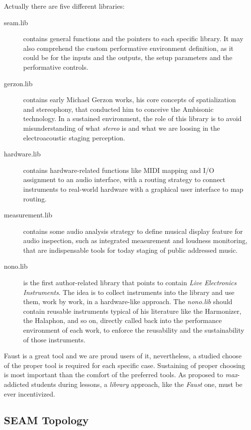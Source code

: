 \documentclass[twoside,a4paper]{article}
\begin{document}
Actually there are five different libraries:
\begin{description}
  \item[seam.lib] contains general functions and the pointers to each specific library. It may also comprehend the custom performative environment definition, as it could be for the inputs and the outputs, the setup parameters and the performative controls.
  \item[gerzon.lib] contains early Michael Gerzon works, his core concepts of spatialization and stereophony, that conducted him to conceive the Ambisonic technology. In a sustained environment, the role of this library is to avoid misunderstanding of what \emph{stereo} is \cite{ab58} and what we are loosing in the electroacoustic staging perception. 
  \item[hardware.lib] contains hardware-related functions like MIDI mapping and I/O assignment to an audio interface, with a routing strategy to connect instruments to real-world hardware with a graphical user interface to map routing.
  \item[measurement.lib] contains some audio analysis strategy to define musical display feature for audio inspection, such as integrated measurement and loudness monitoring, that are indispensable tools for today staging of public addressed music.
  \item[nono.lib] is the first author-related library that points to contain \emph{Live Electronics Instruments}. The idea is to collect instruments into the library and use them, work by work, in a hardware-like approach. The \emph{nono.lib} should contain reusable instruments typical of his literature like the Harmonizer, the Halaphon, and so on, directly called back into the performance environment of each work, to enforce the reusability and the sustainability of those instruments. 
\end{description}

Faust is a great tool and we are proud users of it, nevertheless, a studied choose of the proper tool is required for each specific case. Sustaining of proper choosing is most important than the comfort of the preferred tools. As proposed to \emph{max}-addicted students during lessons, a \emph{library} approach, like the \emph{Faust} one, must be ever incentivized.


\subsection{SEAM Topology}
\end{document}
